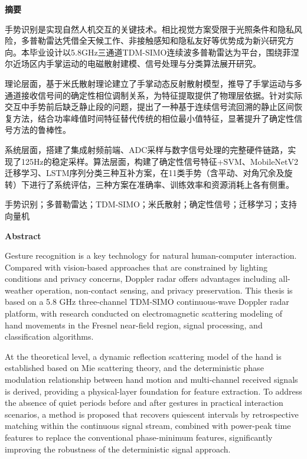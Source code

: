 \setcounter{page}{7}
\begin{center}
    \vspace{0.5ex}
    \bfseries 摘要
    \vspace{0.5ex}
\end{center}


手势识别是实现自然人机交互的关键技术。相比视觉方案受限于光照条件和隐私风险，多普勒雷达凭借全天候工作、非接触感知和隐私友好等优势成为新兴研究方向。本毕业设计以5.8GHz三通道TDM-SIMO连续波多普勒雷达为平台，围绕菲涅尔近场区内手掌运动的电磁散射建模、信号处理与分类算法展开研究。

理论层面，基于米氏散射理论建立了手掌动态反射散射模型，推导了手掌运动与多通道接收信号间的确定性相位调制关系，为特征提取提供了物理层依据。针对实际交互中手势前后缺乏静止段的问题，提出了一种基于连续信号流回溯的静止区间恢复方法，结合功率峰值时间特征替代传统的相位最小值特征，显著提升了确定性信号方法的鲁棒性。

系统层面，搭建了集成射频前端、ADC采样与数字信号处理的完整硬件链路，实现了125Hz的稳定采样。算法层面，构建了确定性信号特征+SVM、MobileNetV2迁移学习、LSTM序列分类三种互补方案，在11类手势（含平动、对角冗余及旋转）下进行了系统评估，三种方案在准确率、训练效率和资源消耗上各有侧重。

手势识别；多普勒雷达；TDM-SIMO；米氏散射；确定性信号；迁移学习；支持向量机

\newpage
\setcounter{page}{9}

\begin{center}
    \vspace{0.5ex}
    \bfseries Abstract
    \vspace{0.5ex}
\end{center}

Gesture recognition is a key technology for natural human-computer interaction. Compared with vision-based approaches that are constrained by lighting conditions and privacy concerns, Doppler radar offers advantages including all-weather operation, non-contact sensing, and privacy preservation. This thesis is based on a 5.8 GHz three-channel TDM-SIMO continuous-wave Doppler radar platform, with research conducted on electromagnetic scattering modeling of hand movements in the Fresnel near-field region, signal processing, and classification algorithms.

At the theoretical level, a dynamic reflection scattering model of the hand is established based on Mie scattering theory, and the deterministic phase modulation relationship between hand motion and multi-channel received signals is derived, providing a physical-layer foundation for feature extraction. To address the absence of quiet periods before and after gestures in practical interaction scenarios, a method is proposed that recovers quiescent intervals by retrospective matching within the continuous signal stream, combined with power-peak time features to replace the conventional phase-minimum features, significantly improving the robustness of the deterministic signal approach.

